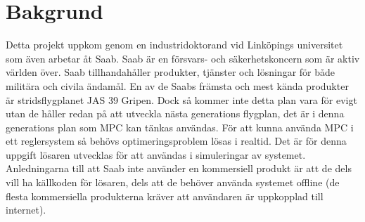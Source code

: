 \section{Bakgrund}    
Detta projekt uppkom genom en industridoktorand vid Linköpings universitet som även arbetar åt Saab. Saab är en försvars- och säkerhetskoncern som är aktiv världen över. Saab  tillhandahåller produkter, tjänster och lösningar för både militära och civila ändamål. \citep{saabbrief}
\newline
\newline
En av de Saabs främsta och mest kända produkter är stridsflygplanet JAS 39 Gripen. Dock så kommer inte detta plan vara för evigt utan de håller redan på att utveckla nästa generations flygplan, det är i denna generations plan som MPC kan tänkas användas. För att kunna använda MPC i ett reglersystem så behövs optimeringsproblem lösas i realtid. Det är för denna uppgift lösaren utvecklas för att användas i simuleringar av systemet. 
\newline
\newline
Anledningarna till att Saab inte använder en kommersiell produkt är att de dels vill ha källkoden för lösaren, dels att de behöver använda systemet offline (de flesta kommersiella produkterna kräver att användaren är uppkopplad till internet).  